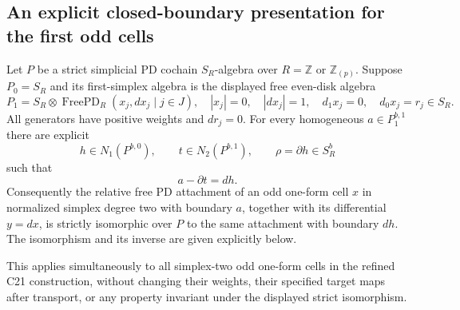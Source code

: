 \subsection{An explicit closed-boundary presentation for the first odd cells}

\begin{proposition}
\label{AT21}
Let $P$ be a strict simplicial PD cochain $S_R$-algebra over
$R=\mathbb Z$ or $\mathbb Z_{(p)}$.
Suppose $P_0=S_R$ and its first-simplex algebra is the
displayed free even-disk algebra
\[
 P_1=S_R\otimes
       \operatorname{FreePD}_R(x_j,dx_j\mid j\in J),
 \quad |x_j|=0,\quad |dx_j|=1,\quad
 d_1x_j=0,\quad d_0x_j=r_j\in S_R .
 \tag{AT.132}
\]
All generators have positive weights and $d r_j=0$.
For every homogeneous $a\in P_1^{b,1}$ there are explicit
\[
 h\in N_1(P^{b,0}),\qquad t\in N_2(P^{b,1}),\qquad
 \rho=\partial h\in S_R^b
\]
such that
\[
                              a-\partial t=dh .
 \tag{AT.133}
\]
Consequently the relative free PD attachment of an odd
one-form cell $x$ in normalized simplex degree two with
boundary $a$, together with its differential $y=dx$,
is strictly isomorphic over $P$ to the same attachment
with boundary $dh$. The isomorphism and its inverse
are given explicitly below.

This applies simultaneously to all simplex-two odd
one-form cells in the refined C21 construction, without
changing their weights, their specified target maps
after transport, or any property invariant under the
displayed strict isomorphism.
\end{proposition}


